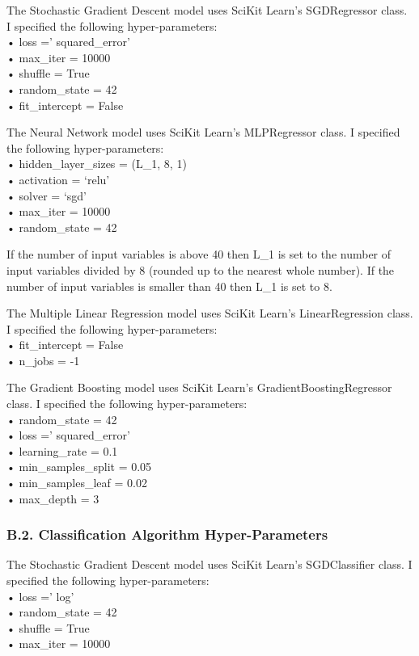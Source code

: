 \documentclass[11pt,preprint, authoryear]{elsarticle}
\numberwithin{equation}{section}
\numberwithin{figure}{section}
\numberwithin{table}{section}
\begin{document}
The Stochastic Gradient Descent model uses SciKit Learn's SGDRegressor
class. I specified the following hyper-parameters:\\
• loss =' squared\_error'\\
• max\_iter = 10000\\
• shuffle = True\\
• random\_state = 42\\
• fit\_intercept = False

The Neural Network model uses SciKit Learn's MLPRegressor class. I
specified the following hyper-parameters:\\
• hidden\_layer\_sizes = (L\_1, 8, 1)\\
• activation = `relu'\\
• solver = `sgd'\\
• max\_iter = 10000\\
• random\_state = 42

If the number of input variables is above 40 then L\_1 is set to the
number of input variables divided by 8 (rounded up to the nearest whole
number). If the number of input variables is smaller than 40 then L\_1
is set to 8.

The Multiple Linear Regression model uses SciKit Learn's
LinearRegression class. I specified the following hyper-parameters:\\
• fit\_intercept = False\\
• n\_jobs = -1

The Gradient Boosting model uses SciKit Learn's
GradientBoostingRegressor class. I specified the following
hyper-parameters:\\
• random\_state = 42\\
• loss =' squared\_error'\\
• learning\_rate = 0.1\\
• min\_samples\_split = 0.05\\
• min\_samples\_leaf = 0.02\\
• max\_depth = 3

\hypertarget{b.2.-classification-algorithm-hyper-parameters}{%
\subsubsection*{B.2. Classification Algorithm
Hyper-Parameters}\label{b.2.-classification-algorithm-hyper-parameters}}

The Stochastic Gradient Descent model uses SciKit Learn's SGDClassifier
class. I specified the following hyper-parameters:\\
• loss =' log'\\
• random\_state = 42\\
• shuffle = True\\
• max\_iter = 10000
\end{document}
